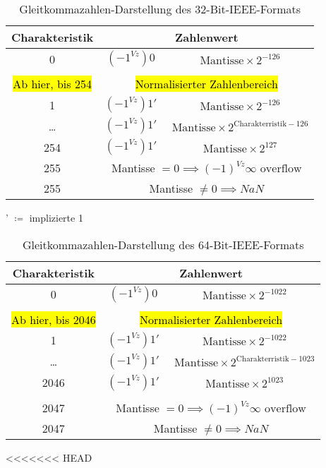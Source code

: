 \documentclass[a4paper]{scrartcl}
\begin{document}
	\begin{table}[h]
		\centering
		\begin{tabular}{|c|c|c|}
			\hline
			Charakteristik& \multicolumn{2}{c|}{Zahlenwert} \\ \hline
			0&\((-1^{Vz})0\) & \( \text{ Mantisse} \times 2^{-126}\) \\ 
			\\
			 \hl{Ab hier, bis 254}& \multicolumn{2}{c|}{\hl{Normalisierter Zahlenbereich}}\\
			1& \((-1^{Vz})1' \) & \( \text{ Mantisse} \times 2^{-126} \)\\
			\dots & \((-1^{Vz})1'\) &\( \text{ Mantisse} \times 2^{\text{Charakterristik}-126}\)\\
			254& \((-1^{Vz})1'\) & \( \text{ Mantisse} \times 2^{127}\)\\ \hline
			255&\multicolumn{2}{c|}{Mantisse \( = 0  \implies (-1)^{Vz} \infty \text{ overflow} \) }\\
			255&\multicolumn{2}{c|}{Mantisse \( \neq 0  \implies NaN \)} \\
			\hline
		\end{tabular}
		\caption{Gleitkommazahlen-Darstellung des 32-Bit-IEEE-Formats}
	\end{table}
	 ' \( \coloneqq \) implizierte 1\\
	 
	 \begin{table}[h]
	 	\centering
	 	\begin{tabular}{|c|c|c|}
	 		\hline
	 		Charakteristik& \multicolumn{2}{c|}{Zahlenwert} \\ \hline
	 		0&\((-1^{Vz})0\) & \( \text{ Mantisse} \times 2^{-1022}\) \\ 
	 		\\
	 		\hl{Ab hier, bis 2046}& \multicolumn{2}{c|}{\hl{Normalisierter Zahlenbereich}}\\
	 		1& \((-1^{Vz})1' \) & \( \text{ Mantisse} \times 2^{-1022} \)\\
	 		\dots & \((-1^{Vz})1'\) &\( \text{ Mantisse} \times 2^{\text{Charakterristik}-1023}\)\\
	 		2046& \((-1^{Vz})1'\) & \( \text{ Mantisse} \times 2^{1023}\)
	 		\\ \hline\\
	 		2047&\multicolumn{2}{c|}{Mantisse \( = 0  \implies (-1)^{Vz} \infty \text{ overflow} \) }\\
	 		2047&\multicolumn{2}{c|}{Mantisse \( \neq 0  \implies NaN \)} \\
	 		\hline
	 	\end{tabular}
	 	\caption{Gleitkommazahlen-Darstellung des 64-Bit-IEEE-Formats}
	 \end{table}
<<<<<<< HEAD
 	
\end{document}
